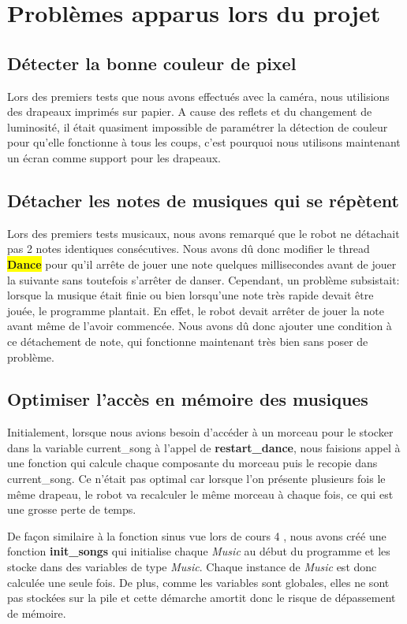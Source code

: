 \documentclass{article}
\begin{document}
    \section{Problèmes apparus lors du projet}
    
    \subsection{Détecter la bonne couleur de pixel}
    \label{problème_couleurs}
    Lors des premiers tests que nous avons effectués avec la caméra, nous utilisions des drapeaux imprimés sur papier. 
    A cause des reflets et du changement de luminosité, il était quasiment impossible de paramétrer la détection de couleur pour qu'elle fonctionne à tous les coups, c'est pourquoi nous utilisons maintenant un écran comme support pour les drapeaux.
    
    \subsection{Détacher les notes de musiques qui se répètent}
    Lors des premiers tests musicaux, nous avons remarqué que le robot ne détachait pas 2 notes identiques consécutives. Nous avons dû donc modifier le thread \colorbox{yellow}{\textbf{Dance}} pour qu'il arrête de jouer une note quelques millisecondes avant de jouer la suivante sans toutefois s'arrêter de danser. Cependant, un problème subsistait: lorsque la musique était finie ou bien lorsqu'une note très rapide devait être jouée, le programme plantait. En effet, le robot devait arrêter de jouer la note avant même de l'avoir commencée. Nous avons dû donc ajouter une condition à ce détachement de note, qui fonctionne maintenant très bien sans poser de problème.
    
    \subsection{Optimiser l'accès en mémoire des musiques}
    Initialement, lorsque nous avions besoin d'accéder à un morceau pour le stocker dans la variable \textcolor{bleu}{current\_song} à l'appel de \textbf{restart\_dance}, nous faisions appel à une fonction qui calcule chaque composante du morceau puis le recopie dans \textcolor{bleu}{current\_song}. 
    Ce n'était pas optimal car lorsque l'on présente plusieurs fois le même drapeau, le robot va recalculer le même morceau à chaque fois, ce qui est une grosse perte de temps. 
    
    De façon similaire à la fonction sinus vue lors de cours 4 \cite{sinus}, nous avons créé une fonction \textbf{init\_songs} qui initialise chaque \textit{Music} au début du programme et les stocke dans des variables de type \textit{Music}.
    Chaque instance de \textit{Music} est donc calculée une seule fois.
    De plus, comme les variables sont globales, elles ne sont pas stockées sur la pile et cette démarche amortit donc le risque de dépassement de mémoire. \cite{stackoverflow} 
   
\end{document}
